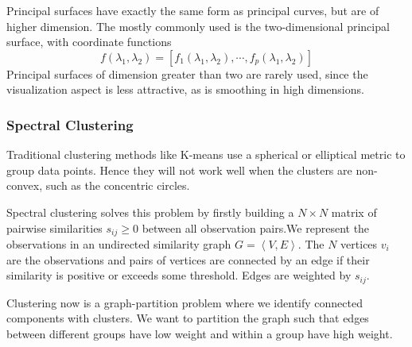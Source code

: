 \documentclass[12pt, letterpaper]{article}
\theoremstyle{definition}
\begin{document}
Principal surfaces have exactly the same form as principal curves, but are of higher dimension. The mostly commonly used is the two-dimensional principal surface, with coordinate functions
\begin{equation}
f(\lambda_1, \lambda_2) = \left[ f_1(\lambda_1, \lambda_2), \cdots, f_p(\lambda_1, \lambda_2)\right]
\end{equation}
Principal surfaces of dimension greater than two are rarely used, since the visualization aspect is less attractive, as is smoothing in high dimensions.

\subsubsection{Spectral Clustering}
Traditional clustering methods like K-means use a spherical or elliptical metric to group data points. Hence they will not work well when the clusters are non-convex, such as the concentric circles.

Spectral clustering solves this problem by firstly building a $N\times N$ matrix of pairwise similarities $s_{ij}\ge 0$ between all observation pairs.We represent the observations in an undirected similarity graph $G = \left\langle V, E\right\rangle$. The $N$ vertices $v_i$ are the observations and pairs of vertices are connected by an edge if their similarity is positive or exceeds some threshold. Edges are weighted by $s_{ij}$.

Clustering now is a graph-partition problem where we identify connected components with clusters. We  want to partition the graph such that edges between different groups have low weight and within a group have high weight.
\end{document}
